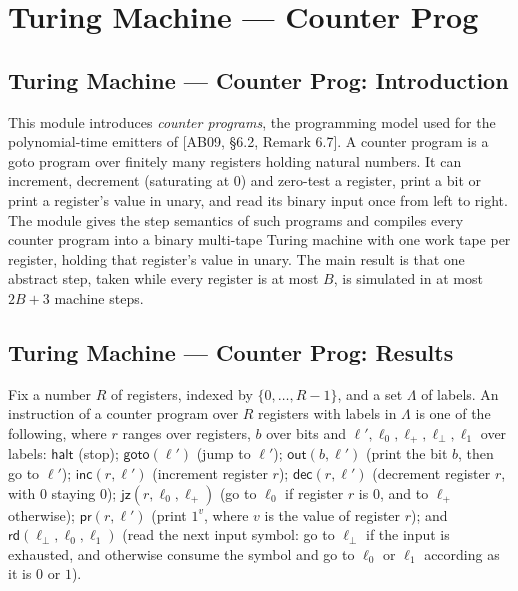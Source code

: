 \section{Turing Machine --- Counter Prog}
\subsection*{Turing Machine --- Counter Prog: Introduction}

This module introduces \emph{counter programs}, the programming model used for the
polynomial-time emitters of [AB09, \S 6.2, Remark 6.7]. A counter program is a goto program
over finitely many registers holding natural numbers. It can increment, decrement (saturating
at $0$) and zero-test a register, print a bit or print a register's value in unary, and read
its binary input once from left to right. The module gives the step semantics of such programs
and compiles every counter program into a binary multi-tape Turing machine with one work tape
per register, holding that register's value in unary. The main result is that one abstract step,
taken while every register is at most $B$, is simulated in at most $2B + 3$ machine steps.

\subsection*{Turing Machine --- Counter Prog: Results}

\begin{definition}
\label{Complexity.CounterProg.Instr}
\leanok
Fix a number $R$ of registers, indexed by $\{0, \dots, R-1\}$, and a set $\Lambda$ of labels.
An instruction of a counter program over $R$ registers with labels in $\Lambda$ is one of the
following, where $r$ ranges over registers, $b$ over bits and $\ell', \ell_0, \ell_+, \ell_\bot,
\ell_1$ over labels: $\mathsf{halt}$ (stop); $\mathsf{goto}(\ell')$ (jump to $\ell'$);
$\mathsf{out}(b, \ell')$ (print the bit $b$, then go to $\ell'$); $\mathsf{inc}(r, \ell')$
(increment register $r$); $\mathsf{dec}(r, \ell')$ (decrement register $r$, with $0$ staying
$0$); $\mathsf{jz}(r, \ell_0, \ell_+)$ (go to $\ell_0$ if register $r$ is $0$, and to $\ell_+$
otherwise); $\mathsf{pr}(r, \ell')$ (print $1^v$, where $v$ is the value of register $r$); and
$\mathsf{rd}(\ell_\bot, \ell_0, \ell_1)$ (read the next input symbol: go to $\ell_\bot$ if the
input is exhausted, and otherwise consume the symbol and go to $\ell_0$ or $\ell_1$ according as
it is $0$ or $1$).
\end{definition}

